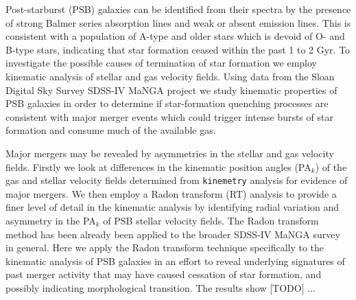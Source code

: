 
Post-starburst (PSB) galaxies can be identified from their spectra by the presence of strong Balmer series absorption lines and weak or absent emission lines. This is consistent with a population of A-type and older stars which is devoid of O- and B-type stars, indicating that star formation ceased within the past 1 to 2 Gyr. To investigate the possible causes of termination of star formation we employ kinematic analysis of stellar and gas velocity fields. Using data from the Sloan Digital Sky Survey SDSS-IV MaNGA project we study  kinematic properties of PSB galaxies in order to determine if star-formation quenching processes are consistent with major merger events which could trigger intense bursts of star formation and  consume much of the available gas. 

Major mergers may be revealed by asymmetries in the stellar and gas velocity fields. Firstly we look at differences in the kinematic position angles (PA$_{k}$) of the gas and stellar velocity fields determined from \texttt{kinemetry} analysis for evidence of major mergers. We then employ a Radon transform (RT) analysis to provide a finer level of detail in the kinematic analysis by identifying radial variation and asymmetry in the PA$_{k}$ of PSB stellar velocity fields. The Radon transform method has been already been applied to the broader SDSS-IV MaNGA survey in general. Here we apply the Radon transform technique specifically to the kinematic analysis of PSB galaxies in an effort to reveal underlying signatures of past merger activity that may have caused cessation of star formation, and possibly indicating morphological transition. The results show [TODO] ... 


